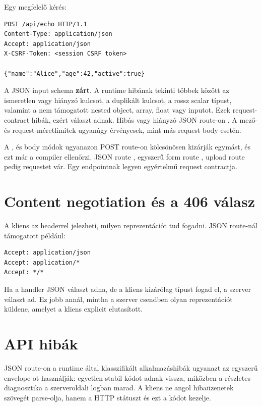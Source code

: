 Egy megfelelő kérés:

\begin{lstlisting}
POST /api/echo HTTP/1.1
Content-Type: application/json
Accept: application/json
X-CSRF-Token: <session CSRF token>

{"name":"Alice","age":42,"active":true}
\end{lstlisting}

A JSON input schema \textbf{zárt}. A runtime hibának tekinti többek között az ismeretlen vagy hiányzó kulcsot, a duplikált kulcsot, a rossz scalar típust, valamint a nem támogatott nested object, array, float vagy  inputot. Ezek request-contract hibák, ezért  választ adnak. Hibás vagy hiányzó  JSON route-on . A mező- és request-méretlimitek ugyanúgy érvényesek, mint más request body esetén.

A ,  és  body módok ugyanazon POST route-on kölcsönösen kizárják egymást, és ezt már a compiler ellenőrzi. JSON route , egyszerű form route , upload route pedig  requestet vár. Egy endpointnak legyen egyértelmű request contractja.

\section{Content negotiation és a 406 válasz}

A kliens az  headerrel jelezheti, milyen reprezentációt tud fogadni. JSON route-nál támogatott például:

\begin{lstlisting}
Accept: application/json
Accept: application/*
Accept: */*
\end{lstlisting}

Ha a handler JSON választ adna, de a kliens kizárólag  típust fogad el, a szerver  választ ad. Ez jobb annál, mintha a szerver csendben olyan reprezentációt küldene, amelyet a kliens explicit elutasított.

\section{API hibák}

JSON route-on a runtime által klasszifikált alkalmazáshibák ugyanazt az egyszerű envelope-ot használják: egyetlen stabil  kódot adnak vissza, miközben a részletes diagnosztika a szerveroldali logban marad. A kliens ne angol hibaüzenetek szövegét parse-olja, hanem a HTTP státuszt és ezt a kódot kezelje.

